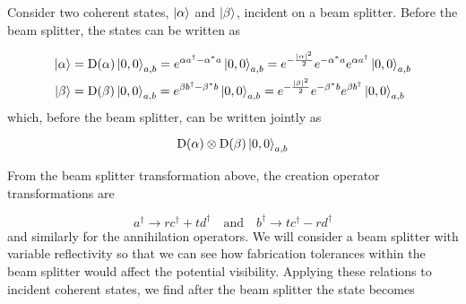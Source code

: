 
Consider two coherent states, $\ket{\alpha}$ and $\ket{\beta}$, incident on a beam splitter. Before the beam splitter, the states can be written as

\begin{align}
	\ket{\alpha} &= \text{D}(\alpha)\ket{0,0}_{a,b} = e^{\alpha a^\dagger - \alpha^\ast a}\ket{0,0}_{a,b} = e^{-\frac{|\alpha|^2}{2}} e^{-\alpha^\ast a} e^{\alpha a^\dagger}\ket{0,0}_{a,b}\\
	\ket{\beta} &= \text{D}(\beta)\ket{0,0}_{a,b} = e^{\beta b^\dagger - \beta^\ast b}\ket{0,0}_{a,b} = e^{-\frac{|\beta|^2}{2}} e^{-\beta^\ast b} e^{\beta b^\dagger}\ket{0,0}_{a,b}
\end{align}
which, before the beam splitter, can be written jointly as

\begin{equation}
	\text{D}(\alpha)\otimes\text{D}(\beta)\ket{0,0}_{a,b}
\end{equation}

%

From the beam splitter transformation above, the creation operator transformations are

\begin{equation}
	a^\dagger \rightarrow rc^\dagger + td^\dagger \quad \text{and} \quad b^\dagger \rightarrow tc^\dagger - rd^\dagger
\end{equation}
and similarly for the annihilation operators. We will consider a beam splitter with variable reflectivity so that we can see how fabrication tolerances within the beam splitter would affect the potential visibility. Applying these relations to incident coherent states, we find after the beam splitter the state becomes


